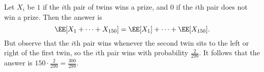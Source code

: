 Let $X_i$ be $1$ if the $i$th pair of twins wins a prize, and $0$ if the $i$th pair does not win a prize. Then the answer is
	\[
		\EE[X_1+\dots+X_{150}]=\EE[X_1]+\dots+\EE[X_{150}].
	\]
	But observe that the $i$th pair wins whenever the second twin sits to the left or right of the first twin, so the $i$th pair wins with probability $\frac{2}{299}$. It follows that the answer is $150\cdot\frac{2}{299}=\frac{300}{299}$.